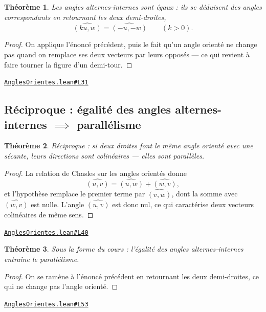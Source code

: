 \documentclass[11pt,a4paper]{article}
\theoremstyle{definition}
\theoremstyle{plain}
\newtheorem{theoreme}{Théorème}
\newcommand{\source}[2]{\par\smallskip\noindent\hfill{\footnotesize\href{#1}{\texttt{#2}}}\par\smallskip}
\begin{document}
\begin{theoreme}
Les \emph{angles alternes-internes} sont égaux : ils se déduisent des angles
correspondants en retournant les deux demi-droites,
\[ \widehat{(ku, w)} = \widehat{(-u, -w)} \qquad (k > 0) . \]
\end{theoreme}

\begin{proof}
On applique l'énoncé précédent, puis le fait qu'un angle orienté ne change pas quand on
remplace ses deux vecteurs par leurs opposés — ce qui revient à faire tourner la figure
d'un demi-tour.
\end{proof}
\source{https://github.com/Commutator-IO/learn-lean/blob/main/courses/01-college/02-geometrie-plane/AnglesOrientes.lean\#L31}{AnglesOrientes.lean\#L31}

\subsection{Réciproque : égalité des angles alternes-internes \(\implies\) parallélisme}

\begin{theoreme}
Réciproque : si deux droites font le même angle orienté avec une sécante, leurs
directions sont colinéaires — elles sont parallèles.
\end{theoreme}

\begin{proof}
La relation de Chasles sur les angles orientés donne
\[ \widehat{(u, v)} = \widehat{(u, w)} + \widehat{(w, v)} , \]
et l'hypothèse remplace le premier terme par $\widehat{(v, w)}$, dont la somme avec
$\widehat{(w, v)}$ est nulle. L'angle $\widehat{(u, v)}$ est donc nul, ce qui caractérise
deux vecteurs colinéaires de même sens.
\end{proof}
\source{https://github.com/Commutator-IO/learn-lean/blob/main/courses/01-college/02-geometrie-plane/AnglesOrientes.lean\#L40}{AnglesOrientes.lean\#L40}

\begin{theoreme}
Sous la forme du cours : l'égalité des angles alternes-internes entraîne le
parallélisme.
\end{theoreme}

\begin{proof}
On se ramène à l'énoncé précédent en retournant les deux demi-droites, ce qui ne change
pas l'angle orienté.
\end{proof}
\source{https://github.com/Commutator-IO/learn-lean/blob/main/courses/01-college/02-geometrie-plane/AnglesOrientes.lean\#L53}{AnglesOrientes.lean\#L53}
\end{document}
